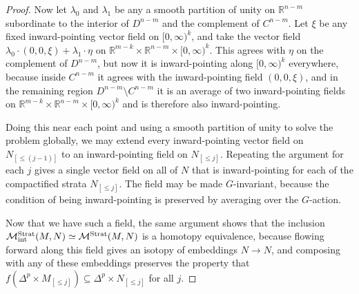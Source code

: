 \documentclass[11pt]{amsart}
\newtheorem{lem}{Lemma}[section]
\theoremstyle{definition}
\numberwithin{equation}{section}
\numberwithin{figure}{section}
\newcommand{\R}{\mathbb R}
\newcommand{\mc}{\mathcal}
\newcommand{\Man}{\mc M^\mathrm{Emb}}
\newcommand{\Manstr}{\mc M^\mathrm{Strat}}
\begin{document}
\begin{proof}
	 Now let $\lambda_0$ and $\lambda_1$ be any a smooth partition of unity on $\R^{n-m}$ subordinate to the interior of $D^{n-m}$ and the complement of $C^{n-m}$. Let $\xi$ be any fixed inward-pointing vector field on $[0,\infty)^k$, and take the vector field $\lambda_0 \cdot (0,0,\xi) + \lambda_1 \cdot \eta$ on $\R^{m-k} \times \R^{n-m} \times [0,\infty)^k$. This agrees with $\eta$ on the complement of $D^{n-m}$, but now it is inward-pointing along $[0,\infty)^k$ everywhere, because inside $C^{n-m}$ it agrees with the inward-pointing field $(0,0,\xi)$, and in the remaining region $D^{n-m} \setminus C^{n-m}$ it is an average of two inward-pointing fields on $\R^{m-k} \times \R^{n-m} \times [0,\infty)^k$ and is therefore also inward-pointing.
	
	Doing this near each point and using a smooth partition of unity to solve the problem globally, we may extend every inward-pointing vector field on $N_{[\leq (j-1)]}$ to an inward-pointing field on $N_{[\leq j]}$. Repeating the argument for each $j$ gives a single vector field on all of $N$ that is inward-pointing for each of the compactified strata $N_{[\leq j]}$. The field may be made $G$-invariant, because the condition of being inward-pointing is preserved by averaging over the $G$-action.
	
	Now that we have such a field, the same argument shows that the inclusion $\Manstr_{\textup{int}}(M,N) \simeq \Manstr(M,N)$ is a homotopy equivalence, because flowing forward along this field gives an isotopy of embeddings $N \to N$, and composing with any of these embeddings preserves the property that $f(\Delta^p \times M_{[\leq j]}) \subseteq \Delta^p \times N_{[\leq j]}$ for all $j$.
\end{proof}
	
% 
  
\end{document}
